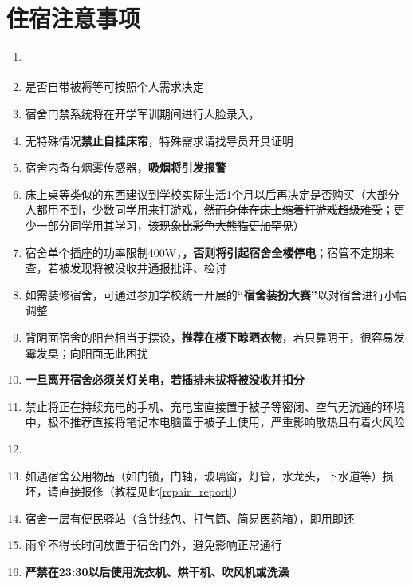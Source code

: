 \section[住宿注意事项]{住宿注意事项}
\begin{enumerate}
    \item \textbf{}
          \label{random_allocation}
    \item 是否自带被褥等可按照个人需求决定\footnotemark
    \item 宿舍门禁系统将在开学军训期间进行人脸录入，\textbf{}
    \item 无特殊情况\textbf{禁止自挂床帘}，特殊需求请找导员开具证明
    \item 宿舍内备有烟雾传感器，\textbf{吸烟将引发报警\footnotemark}
    \item 床上桌等类似的东西建议到学校实际生活1个月以后再决定是否购买（大部分人都用不到，少数同学用来打游戏，\sout{然而身体在床上缩着打游戏超级难受}；更少一部分同学用其学习，\sout{该现象\linebreak[3]比彩色大熊猫更加罕见}）
    \item 宿舍单个插座的功率限制400W\footnotemark，\textbf{，否则将引起宿舍全楼停电}；宿管不定期来查，若被发现将被没收并通报批评、检讨
    \item 如需装修宿舍，可通过参加学校统一开展的\textbf{“宿舍装扮大赛”}\footnotemark 以对宿舍进行小幅调整
    \item 背阴面宿舍的阳台相当于摆设，\textbf{推荐在楼下晾晒衣物}，若只靠阴干，很容易发霉发臭；向阳面无此困扰
    \item \textbf{一旦离开宿舍必须关灯关电，若插排未拔将被没收并扣分}
    \item 禁止将正在持续充电的手机、充电宝直接置于被子等密闭、空气无流通的环境中，极不推荐直接将笔记本电脑置于被子上使用，严重影响散热且有着火风险
    \item \textbf{}\footnotemark
    \item 如遇宿舍公用物品（如门锁，门轴，玻璃窗，灯管，水龙头，下水道等）损坏，请直接报修（教程见此\uline{\ref{repair_report}}）
    \item 宿舍一层有便民驿站（含针线包、打气筒、简易医药箱），即用即还
    \item 雨伞不得长时间放置于宿舍门外，避免影响正常通行
    \item \textbf{严禁在23:30以后使用洗衣机、烘干机、吹风机或洗澡}
\end{enumerate}

